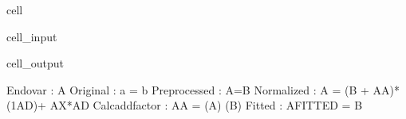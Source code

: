 \documentclass[letterpaper,10pt,english]{jupyterBook}
\begin{document}
\begin{sphinxuseclass}{cell}\begin{sphinxVerbatimInput}

\begin{sphinxuseclass}{cell_input}
\begin{sphinxVerbatim}[commandchars=\\\{\}]
\end{sphinxVerbatim}

\end{sphinxuseclass}\end{sphinxVerbatimInput}
\begin{sphinxVerbatimOutput}

\begin{sphinxuseclass}{cell_output}
\begin{sphinxVerbatim}[commandchars=\\\{\}]
Endo\PYGZus{}var        : A
Original        : a = b
Preprocessed    : A=B
Normalized      : A = (B + A\PYGZus{}A)* (1\PYGZhy{}A\PYGZus{}D)+ A\PYGZus{}X*A\PYGZus{}D 
Calc\PYGZus{}add\PYGZus{}factor : A\PYGZus{}A = (A) \PYGZhy{} (B)
Fitted          : A\PYGZus{}FITTED = B
\end{sphinxVerbatim}

\begin{sphinxVerbatim}[commandchars=\\\{\}]

\end{sphinxVerbatim}

\end{sphinxuseclass}\end{sphinxVerbatimOutput}

\end{sphinxuseclass}
\end{document}
